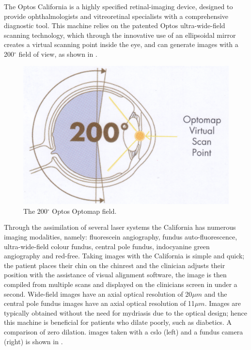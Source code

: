 The Optos California is a highly specified retinal-imaging device,
designed to provide ophthalmologists and vitreoretinal specialists
with a comprehensive diagnostic tool. This machine relies on the
patented Optos ultra-wide-field scanning technology, which through
the innovative use of an ellipsoidal mirror creates a virtual scanning
point inside the eye, and can generate images with a 200$^\circ$ field
of view, as shown in . 

\begin{figure}[H]
\centering
\includegraphics{figures/optoswide}
\caption{The 200$^\circ$ Optos Optomap field.\cite{1_optos.com_2015}}
\label{fig:wideview}
   \end{figure}

Through the assimilation of several \gls{laser} systems the California
has numerous imaging modalities, namely: fluorescein angiography,
fundus auto-fluorescence, ultra-wide-field colour fundus, central pole
fundus, indocyanine green angiography and red-free.\cite{7_burnett_hodd_2012} Taking images with the California is simple and quick; the patient places
their chin on the chinrest and the clinician adjusts their position with the
assistance of visual alignment software, the image is then compiled
from multiple scans and displayed on the clinicians screen in under a second. Wide-field images have an axial optical resolution of 20$\mu m$ and the
central pole fundus images have an axial optical resolution of
11$\mu m$. Images are typically obtained without the need for mydriasis
due to the optical design; hence this machine is beneficial for patients who
dilate poorly, such as diabetics. A comparison of zero dilation.\cite{11_de_brouwere_2013} images taken with a \gls{cslo} (left)
and a fundus camera (right) is shown in . 


